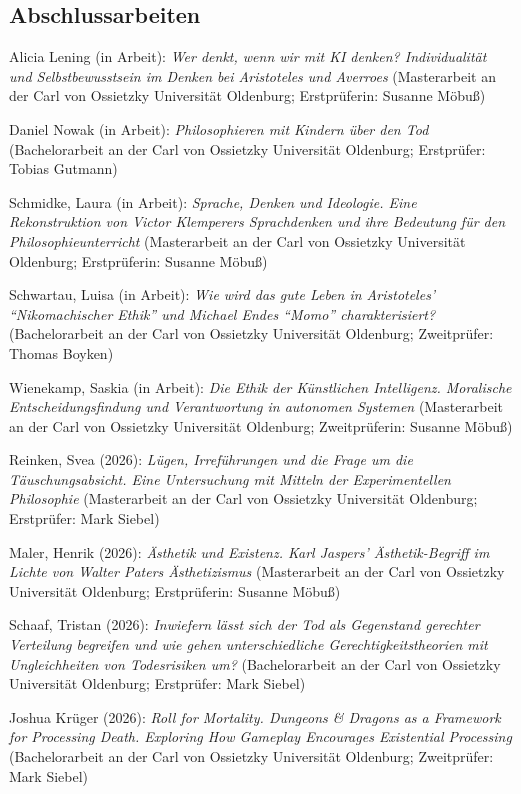 \documentclass[a4paper,10pt]{article}
\newenvironment{literature}{%
   \parskip6pt\parindent0pt\raggedright
   \def\lititem{\hangindent=1cm\hangafter1}}{%
   \par\ignorespaces}
\begin{document}
\subsection*{Abschlussarbeiten}
\begin{literature}
\lititem Alicia Lening (in Arbeit): \textit{Wer denkt, wenn wir mit KI denken? Individualität und Selbstbewusstsein im Denken bei Aristoteles und Averroes} (Masterarbeit an der Carl von Ossietzky Universität Oldenburg; Erstprüferin: Susanne Möbuß)

\lititem Daniel Nowak (in Arbeit): \textit{Philosophieren mit Kindern über den Tod} (Bachelorarbeit an der Carl von Ossietzky Universität Oldenburg; Erstprüfer: Tobias Gutmann)

\lititem Schmidke, Laura (in Arbeit): \textit{Sprache, Denken und Ideologie. Eine Rekonstruktion von Victor Klemperers Sprachdenken und ihre Bedeutung für den Philosophieunterricht} (Masterarbeit an der Carl von Ossietzky Universität Oldenburg; Erstprüferin: Susanne Möbuß)

\lititem Schwartau, Luisa (in Arbeit): \textit{Wie wird das gute Leben in Aristoteles' \enquote{Nikomachischer Ethik} und Michael Endes \enquote{Momo} charakterisiert?} (Bachelorarbeit an der Carl von Ossietzky Universität Oldenburg; Zweitprüfer: Thomas Boyken)

\lititem Wienekamp, Saskia (in Arbeit): \textit{Die Ethik der Künstlichen Intelligenz. Moralische Entscheidungsfindung und Verantwortung in autonomen Systemen} (Masterarbeit an der Carl von Ossietzky Universität Oldenburg; Zweitprüferin: Susanne Möbuß)

\lititem Reinken, Svea (2026): \textit{Lügen, Irreführungen und die Frage um die Täuschungsabsicht. Eine Untersuchung mit Mitteln der Experimentellen Philosophie} (Masterarbeit an der Carl von Ossietzky Universität Oldenburg; Erstprüfer: Mark Siebel)

\lititem Maler, Henrik (2026): \textit{Ästhetik und Existenz. Karl Jaspers' Ästhetik-Begriff im Lichte von Walter Paters Ästhetizismus} (Masterarbeit an der Carl von Ossietzky Universität Oldenburg; Erstprüferin: Susanne Möbuß)

\lititem Schaaf, Tristan (2026): \textit{Inwiefern lässt sich der Tod als Gegenstand gerechter Verteilung begreifen und wie gehen unterschiedliche Gerechtigkeitstheorien mit Ungleichheiten von Todesrisiken um?} (Bachelorarbeit an der Carl von Ossietzky Universität Oldenburg; Erstprüfer: Mark Siebel)

\lititem Joshua Krüger (2026): \textit{Roll for Mortality. \textit{Dungeons \& Dragons} as a Framework for Processing Death. Exploring How Gameplay Encourages Existential Processing} (Bachelorarbeit an der Carl von Ossietzky Universität Oldenburg; Zweitprüfer: Mark Siebel)


\end{literature}
\end{document}
